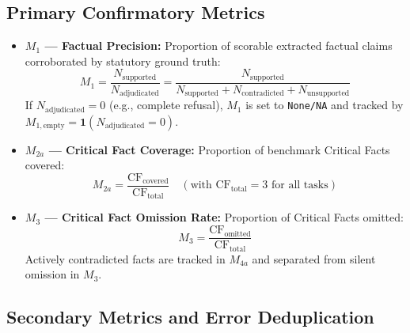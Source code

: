 \documentclass[11pt,a4paper]{article}
\begin{document}
\subsection{Primary Confirmatory Metrics}
\label{sec:primary_metrics}

\begin{itemize}
  \item \textbf{$M_1$ --- Factual Precision:} Proportion of scorable extracted factual claims corroborated by statutory ground truth:
    \begin{equation}
    \label{eq:m1}
    M_1 = \frac{N_{\text{supported}}}{N_{\text{adjudicated}}} = \frac{N_{\text{supported}}}{N_{\text{supported}} + N_{\text{contradicted}} + N_{\text{unsupported}}}
    \end{equation}
    If $N_{\text{adjudicated}} = 0$ (e.g., complete refusal), $M_1$ is set to \texttt{None/NA} and tracked by $M_{1,\text{empty}} = \mathbf{1}(N_{\text{adjudicated}} = 0)$.
  \item \textbf{$M_{2a}$ --- Critical Fact Coverage:} Proportion of benchmark Critical Facts covered:
    \begin{equation}
    \label{eq:m2a}
    M_{2a} = \frac{\text{CF}_{\text{covered}}}{\text{CF}_{\text{total}}} \quad (\text{with } \text{CF}_{\text{total}} = 3 \text{ for all tasks})
    \end{equation}
  \item \textbf{$M_3$ --- Critical Fact Omission Rate:} Proportion of Critical Facts omitted:
    \begin{equation}
    \label{eq:m3}
    M_3 = \frac{\text{CF}_{\text{omitted}}}{\text{CF}_{\text{total}}}
    \end{equation}
    Actively contradicted facts are tracked in $M_{4a}$ and separated from silent omission in $M_3$.
\end{itemize}

\subsection{Secondary Metrics and Error Deduplication}
\label{sec:secondary_metrics}
\end{document}
